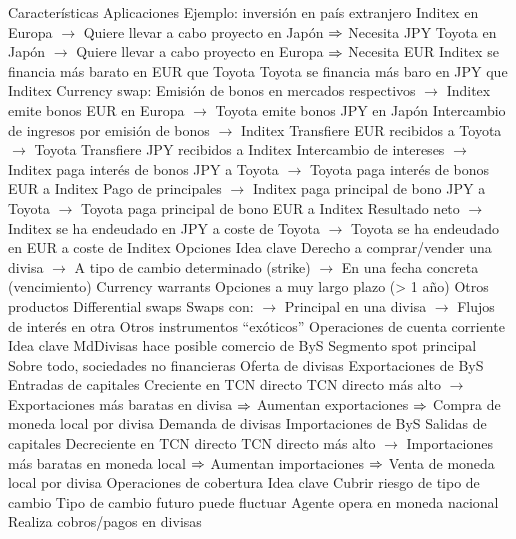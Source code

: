 \documentclass{nuevotema}
\begin{document}
\begin{esquemal}
			\3 Características
			\3 Aplicaciones
				\4 Ejemplo: inversión en país extranjero
				\4 Inditex en Europa
				\4[] $\to$ Quiere llevar a cabo proyecto en Japón
				\4[] $\Rightarrow$ Necesita JPY
				\4 Toyota en Japón
				\4[] $\to$ Quiere llevar a cabo proyecto en Europa
				\4[] $\Rightarrow$ Necesita EUR
				\4 Inditex se financia más barato en EUR que Toyota
				\4[] Toyota se financia más baro en JPY que Inditex
				\4 Currency swap:
				\4[1.] Emisión de bonos en mercados respectivos
				\4[] $\to$ Inditex emite bonos EUR en Europa
				\4[] $\to$ Toyota emite bonos JPY en Japón
				\4[2.] Intercambio de ingresos por emisión de bonos
				\4[] $\to$ Inditex Transfiere EUR recibidos a Toyota
				\4[] $\to$ Toyota Transfiere JPY recibidos a Inditex
				\4[3.] Intercambio de intereses
				\4[] $\to$ Inditex paga interés de bonos JPY a Toyota
				\4[] $\to$ Toyota paga interés de bonos EUR a Inditex
				\4[4.] Pago de principales
				\4[] $\to$ Inditex paga principal de bono JPY a Toyota
				\4[] $\to$ Toyota paga principal de bono EUR a Inditex
				\4[5.] Resultado neto
				\4[] $\to$ Inditex se ha endeudado en JPY a coste de Toyota
				\4[] $\to$ Toyota se ha endeudado en EUR a coste de Inditex
		\2 Opciones
			\3 Idea clave
				\4 Derecho a comprar/vender una divisa
				\4[] $\to$ A tipo de cambio determinado (strike)
				\4[] $\to$ En una fecha concreta (vencimiento)
				\4 Currency warrants
				\4[] Opciones a muy largo plazo (> 1 año)
		\2 Otros productos
			\3 Differential swaps
				\4[] Swaps con:
				\4[] $\to$ Principal en una divisa
				\4[] $\to$ Flujos de interés en otra
			\3 Otros instrumentos ``exóticos''
	\1 
		\2 Operaciones de cuenta corriente
			\3 Idea clave
				\4 MdDivisas hace posible comercio de ByS
				\4 Segmento spot principal
				\4 Sobre todo, sociedades no financieras
			\3 Oferta de divisas
				\4 Exportaciones de ByS
				\4 Entradas de capitales
				\4 Creciente en TCN directo
				\4[] TCN directo más alto
				\4[] $\to$ Exportaciones más baratas en divisa
				\4[] $\Rightarrow$ Aumentan exportaciones
				\4[] $\Rightarrow$ Compra de moneda local por divisa
			\3 Demanda de divisas
				\4 Importaciones de ByS
				\4 Salidas de capitales
				\4 Decreciente en TCN directo
				\4[] TCN directo más alto
				\4[] $\to$ Importaciones más baratas en moneda local
				\4[] $\Rightarrow$ Aumentan importaciones
				\4[] $\Rightarrow$ Venta de moneda local por divisa
		\2 Operaciones de cobertura
			\3 Idea clave
				\4 Cubrir riesgo de tipo de cambio
				\4 Tipo de cambio futuro puede fluctuar
				\4[] Agente opera en moneda nacional
				\4[] Realiza cobros/pagos en divisas

\end{esquemal}
\end{document}
